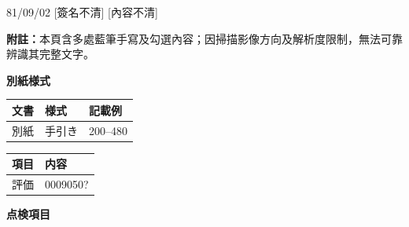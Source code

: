 \documentclass[UTF8,10pt,a4paper,fontset=fandol]{ctexart}
\newcommand{\fieldvalue}[1]{#1}
\newcommand{\handwritten}[1]{#1}
\begin{document}
\vspace{0.5em}

\noindent
\fieldvalue{\handwritten{81/09/02}} \hfill
\fieldvalue{\handwritten{[簽名不清]}} \hfill
\fieldvalue{\handwritten{[內容不清]}} 

\vspace{1em}

\noindent\textbf{附註：}本頁含多處藍筆手寫及勾選內容；因掃描影像方向及解析度限制，無法可靠辨識其完整文字。

\newpage

\begin{center}
\textbf{別紙様式}
\end{center}

\begin{tabularx}{\textwidth}{|l|X|l|}
\hline
文書 & 様式 & 記載例 \\
\hline
別紙 & 手引き & 200--480 \\
\hline
\end{tabularx}

\vspace{0.5em}

\begin{tabularx}{\textwidth}{|p{}|X|}
\hline
項目 & 内容 \\
\hline
評価 & 
\fieldvalue{\handwritten{0009050?}} \\
\hline
\end{tabularx}

\vspace{0.5em}

\noindent
\textbf{点検項目}
\end{document}

